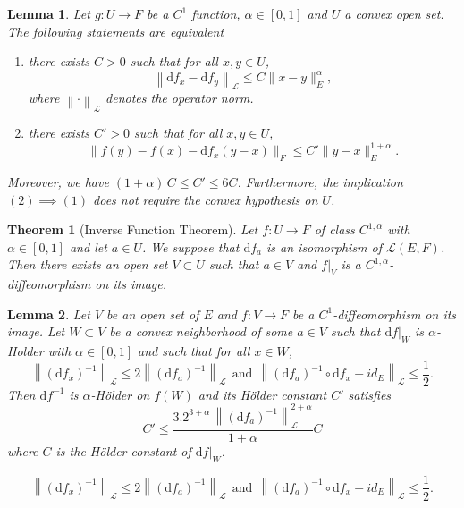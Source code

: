 \documentclass[10pt,a4paper]{amsart}
\newtheorem{lemma}{Lemma}
\newtheorem{theorem}{Theorem}
\renewcommand{\d}{\mathrm{d}}
\renewcommand{\leq}{\leqslant}
\newcommand{\opnorm}[1]{{\left\| #1 \right\|}_{\mathcal{L}}}
\begin{document}
\begin{lemma} \label{lem: carac_c_1_alpha}
    Let $g : U \to F$ be a $C^{1}$ function, $\alpha \in [0,1]$ and $U$ a convex open set.
    The following statements are equivalent
    \begin{enumerate}
        \item there exists $C > 0$ such that for all $x,y \in U$,
    \[\opnorm{ \d f_x - \d f_y} \leq C \|x -y\|_E^\alpha,\]
    where $\opnorm{\cdot}$ denotes the operator norm.

        \item there exists $C' > 0$ such that for all $x,y \in U$,
    \[\| f(y) - f(x) - \d f_x(y-x)\|_F \leq C' \|y-x\|_E^{1 + \alpha}.\]
    \end{enumerate}
    Moreover, we have $(1+\alpha)\,  C \leq C' \leq 6 C$. Furthermore, the implication $(2) \implies (1)$ does not require the convex hypothesis on $U$.
\end{lemma}

\begin{theorem}[Inverse Function Theorem] \label{theo: inverse_function}
    Let $f : U \to F$ of class $C^{1,\alpha}$ with $\alpha \in [ 0 , 1]$ and let $a \in U$. We suppose that $\d f_a$ is an isomorphism of $\mathscr{L}(E,F)$. Then there exists an open set $V \subset U$ such that $a \in V$ and $f \vert_V$ is a $C^{1,\alpha}$-diffeomorphism on its image.
\end{theorem}

\begin{lemma} \label{lem: constant_holder_inversion_local}
    Let $V$ be an open set of $E$ and $f : V \to F$ be a $C^{1}$-diffeomorphism on its image.
    Let $W \subset V$ be a convex neighborhood of some $a \in V$ such that $\d f |_W$ is $\alpha$-Holder with $\alpha \in [ 0 , 1]$ and such that for all $x \in W$, 
    \begin{equation} \label{eq: condition_alpha_holder_sur_tout_ouvert}
        \opnorm{(\d f_x)^{-1}} \leq 2  \opnorm{(\d f_a)^{-1}} ~~ \text{and} ~~ \opnorm{ (\d f_a)^{-1} \circ \d f_x   - id_E } \leq \frac{1}{2}  .
    \end{equation}
    Then $\d f^{-1}$ is $\alpha$-Hölder on $f(W)$ and its Hölder constant $C'$ satisfies
    $$ C' \leq \frac{ 3.2^{3 + \alpha} \, \opnorm{ (\d f_a)^{-1} }^{2+\alpha}}{1 + \alpha} C$$
    where $C$ is the Hölder constant of $\d f|_W$.
\end{lemma}

    \begin{equation} 
        \opnorm{(\d f_x)^{-1}} \leq 2  \opnorm{(\d f_a)^{-1}} ~~ \text{and} ~~ \opnorm{ (\d f_a)^{-1} \circ \d f_x   - id_E } \leq \frac{1}{2}  .
    \end{equation}
\end{document}
